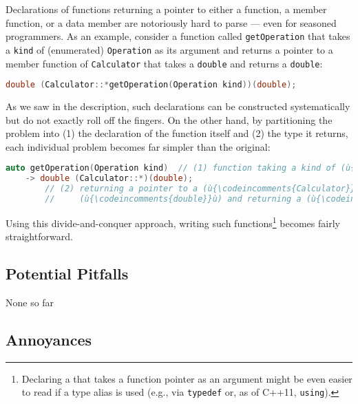 Declarations of functions returning a pointer to either a function, a member function, or a data member are notoriously hard to parse --- even for seasoned programmers. As an example, consider a function called
\lstinline!getOperation! that takes a \lstinline!kind! of
(enumerated) \lstinline!Operation! as its argument and returns a pointer to a member
function of \lstinline!Calculator! that takes a \lstinline!double! and
returns a \lstinline!double!:

\begin{lstlisting}[language=C++]
double (Calculator::*getOperation(Operation kind))(double);
\end{lstlisting}
    
\noindent As we saw in the description, such declarations can be constructed
systematically but do not exactly roll off the fingers. On the other
hand, by partitioning the problem into (1) the declaration of the
function itself and (2) the type it returns, each individual problem
becomes far simpler than the original:

\begin{lstlisting}[language=C++]
auto getOperation(Operation kind)  // (1) function taking a kind of (ù{\codeincomments{Operation}}ù)
    -> double (Calculator::*)(double);  
        // (2) returning a pointer to a (ù{\codeincomments{Calculator}}ù) member function taking a 
        //     (ù{\codeincomments{double}}ù) and returning a (ù{\codeincomments{double}}ù)                                        
\end{lstlisting}
    
\noindent Using this divide-and-conquer approach, writing such functions{\cprotect\footnote{Declaring a  that
takes a function pointer as an argument might be even easier to read
if a type alias is used (e.g., via \lstinline!typedef! or, as of C++11,
  \lstinline!using!).}} becomes fairly straightforward.

\subsection[Potential Pitfalls]{Potential Pitfalls}\label{potential-pitfalls}

None so far

\subsection[Annoyances]{Annoyances}\label{annoyances}

